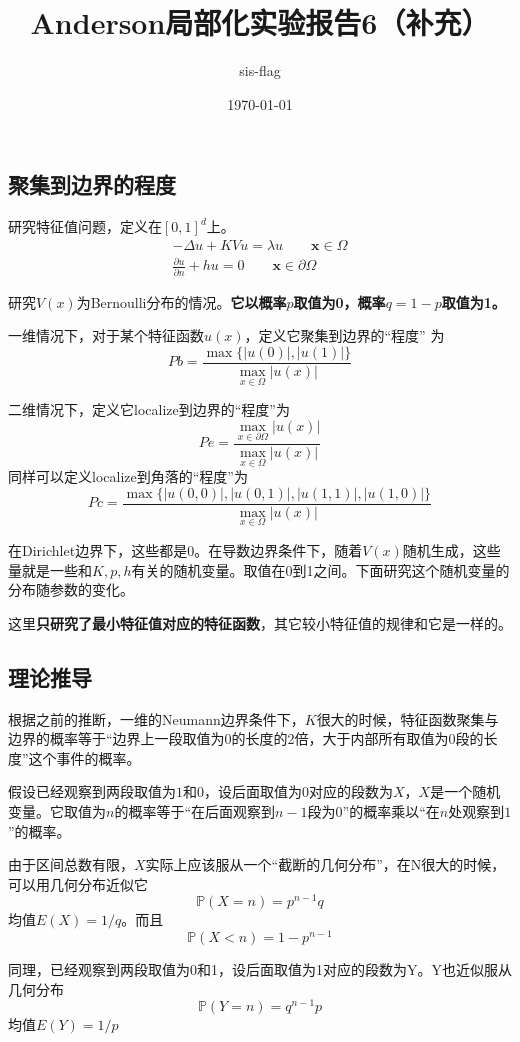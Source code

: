 \documentclass[12pt,a4paper]{article}
\title{Anderson局部化实验报告6（补充）}
\author{sis-flag}
\date{\today}
\begin{document}
\maketitle

\subsection*{聚集到边界的程度}

研究特征值问题，定义在$[0,1]^d$上。
\begin{align*}
-\Delta u + K V u = \lambda u \qquad \mathbf{x} \in \Omega \\
\frac{\partial u}{\partial n} + h u = 0 \qquad \mathbf{x} \in \partial \Omega
\end{align*}

研究$V(x)$为Bernoulli分布的情况。\textbf{它以概率$p$取值为0，概率$q=1-p$取值为1。}

一维情况下，对于某个特征函数$u(x)$，定义它聚集到边界的“程度”
为$$ Pb = \frac{\max\{|u(0)|, |u(1)|\}}{\max_{x \in \Omega} |u(x)|} $$

二维情况下，定义它localize到边界的“程度”为
$$ Pe = \frac{\max_{x \in \partial\Omega} |u(x)|}{\max_{x \in \Omega} |u(x)|} $$
同样可以定义localize到角落的“程度”为
$$ Pc = \frac{\max\{|u(0,0)|, |u(0,1)|, |u(1,1)|, |u(1,0)|\}}{\max_{x \in \Omega} |u(x)|} $$

在Dirichlet边界下，这些都是0。在导数边界条件下，随着$V(x)$随机生成，这些量就是一些和$K,p,h$有关的随机变量。取值在0到1之间。下面研究这个随机变量的分布随参数的变化。

这里\textbf{只研究了最小特征值对应的特征函数}，其它较小特征值的规律和它是一样的。

\subsection*{理论推导}

根据之前的推断，一维的Neumann边界条件下，$K$很大的时候，特征函数聚集与边界的概率等于“边界上一段取值为0的长度的2倍，大于内部所有取值为0段的长度”这个事件的概率。

假设已经观察到两段取值为$1$和$0$，设后面取值为$0$对应的段数为$X$，$X$是一个随机变量。它取值为$n$的概率等于“在后面观察到$n-1$段为$0$”的概率乘以“在$n$处观察到$1$”的概率。

由于区间总数有限，$X$实际上应该服从一个“截断的几何分布”，在N很大的时候，可以用几何分布近似它
$$ \mathbb{P}(X = n) = p^{n-1} q $$
均值$E(X) = 1/q$。而且
$$ \mathbb{P}(X < n) = 1 - p^{n-1} $$

同理，已经观察到两段取值为0和1，设后面取值为1对应的段数为Y。Y也近似服从几何分布
$$ \mathbb{P}(Y = n) = q^{n-1} p $$
均值$E(Y) = 1/p$
\end{document}
